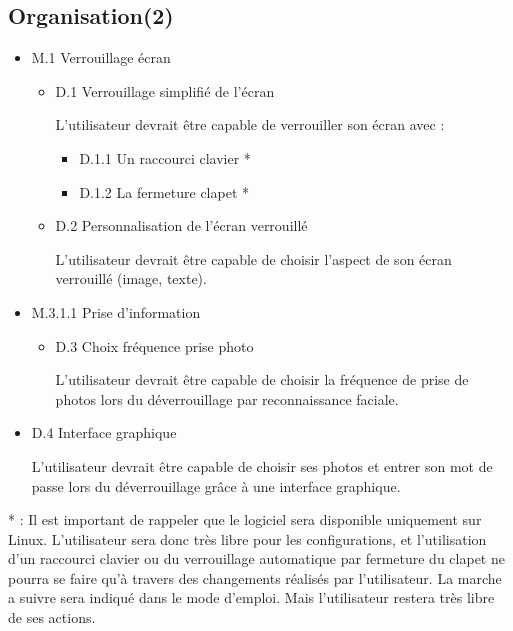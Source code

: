   \subsection{Organisation(2)}
  \begin{itemize}
  \item{M.1 Verrouillage écran}
    \begin{itemize}
    \item{D.1 Verrouillage simplifié de l’écran}

    L’utilisateur devrait être capable de verrouiller son écran avec :
      \begin{itemize}
      \item{D.1.1 Un raccourci clavier *}
      \item{D.1.2 La fermeture clapet *}
      \\
      \end{itemize}
      \item{D.2 Personnalisation de l’écran verrouillé}

      L’utilisateur devrait être capable de choisir l’aspect 	de son écran
      verrouillé (image, texte).
      \\
    \end{itemize}
    \item{M.3.1.1 Prise d’information}
    \begin{itemize}
      \item{D.3 Choix fréquence prise photo}

      L’utilisateur devrait être capable de choisir la 	fréquence de prise de
      photos lors du déverrouillage par reconnaissance faciale.
      \\
    \end{itemize}
    \item{D.4 Interface graphique}

    L’utilisateur devrait être capable de choisir ses photos et entrer son mot
    de passe lors du déverrouillage grâce à une interface graphique.
  \end{itemize}
\vspace{0.5cm}

* : Il est important de rappeler que le logiciel sera disponible uniquement sur
Linux. L'utilisateur sera donc très libre pour les configurations, et l'utilisation
d'un raccourci clavier ou du verrouillage automatique par fermeture du clapet
ne pourra se faire qu'à travers des changements réalisés par l'utilisateur. La
marche a suivre sera indiqué dans le mode d'emploi. Mais l'utilisateur restera
très libre de ses actions.


